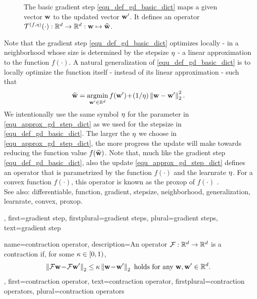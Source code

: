 {{\begin{figure}[H]
\begin{center}
\begin{tikzpicture}[scale=0.8]
				\end{tikzpicture}
			\end{center}
			\caption{The basic \gls{gradient} step \eqref{equ_def_gd_basic_dict} maps a given vector $\weights$ 
			to the updated vector $\weights'$. It defines an operator 
			$\mathcal{T}^{(f,\lrate)}(\cdot): \mathbb{R}^{\nrfeatures} \rightarrow \mathbb{R}^{\nrfeatures}:
			 \weights \mapsto \widehat{\weights}$.}
			\label{fig_basic_GD_step_single_dict}
		\end{figure}
		Note that the \gls{gradient} step \eqref{equ_def_gd_basic_dict} optimizes locally - 
		in a \gls{neighborhood} whose size is determined by the \gls{stepsize} $\lrate$ - a linear approximation 
		to the \gls{function} $f(\cdot)$. A natural \gls{generalization} of \eqref{equ_def_gd_basic_dict} is to locally 
		optimize the \gls{function} itself - instead of its linear approximation - such that
		\begin{align} 
		\label{equ_approx_gd_step_dict}
		\widehat{\weights} = \argmin_{\weights' \in \mathbb{R}^{\dimlocalmodel}} f(\weights')\!+\!(1/\lrate)\normgeneric{\weights-\weights'}{2}^2. 
		\end{align}
		We intentionally use the same symbol $\lrate$ for the \gls{parameter} in \eqref{equ_approx_gd_step_dict} 
		as we used for the \gls{stepsize} in \eqref{equ_def_gd_basic_dict}. The larger the $\lrate$ we choose in 
		\eqref{equ_approx_gd_step_dict}, the more progress the update will make towards reducing the 
		\gls{function} value $f(\widehat{\weights})$. Note that, much like the \gls{gradient} step \eqref{equ_def_gd_basic_dict}, 
		also the update \eqref{equ_approx_gd_step_dict} defines an operator 
		that is parametrized by the \gls{function} $f(\cdot)$ and the \gls{learnrate} $\lrate$. For a \gls{convex} \gls{function}  
		$f(\cdot)$, this operator is known as the \gls{proxop} of $f(\cdot)$ \cite{ProximalMethods}. 
					\\ 
		See also: \gls{differentiable}, \gls{function}, \gls{gradient}, \gls{stepsize}, \gls{neighborhood}, \gls{generalization}, \gls{learnrate}, \gls{convex}, \gls{proxop}.
		},
		first={gradient step},
		firstplural={gradient steps},
		plural={gradient steps},
		text={gradient step}
}

{name={contraction operator},
	description={An operator $\fixedpointop: \mathbb{R}^{\nrfeatures} \rightarrow \mathbb{R}^{\nrfeatures}$
		is a contraction if, for some $\contractfac \in [0,1)$,
		\begin{equation} 
			\nonumber
			\normgeneric{ \fixedpointop \weights\!-\!\fixedpointop \weights'}{2}  \leq  \contractfac	\normgeneric{\weights\!-\!\weights'}{2} \mbox{ holds for any } \weights,\weights' \in \mathbb{R}^{\nrfeatures}.
		\end{equation}
	},
	first={contraction operator},
	text={contraction operator}, 
	firstplural={contraction operators}, 
	plural={contraction operators}
}
	

